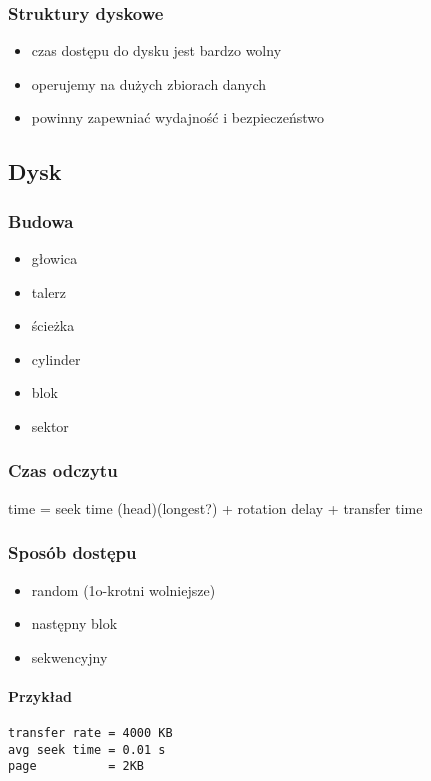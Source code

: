 \documentclass[12pt]{article}
\begin{document}
\subsubsection{Struktury dyskowe}
\begin{itemize}
\item czas dostępu do dysku jest bardzo wolny
\item operujemy na dużych zbiorach danych
\item powinny zapewniać wydajność i bezpieczeństwo
\end{itemize}

\subsection{Dysk}
\subsubsection{Budowa}
\begin{itemize}
\item głowica
\item talerz
\item ścieżka
\item cylinder
\item blok
\item sektor
\end{itemize}

\subsubsection{Czas odczytu}
time = seek time (head)(longest?) + rotation delay + transfer time

\subsubsection{Sposób dostępu}
\begin{itemize}
\item random (1o-krotni wolniejsze)
\item następny blok
\item sekwencyjny
\end{itemize}

\paragraph{Przykład}
\begin{verbatim}
transfer rate = 4000 KB
avg seek time = 0.01 s
page          = 2KB
\end{verbatim}
\end{document}
